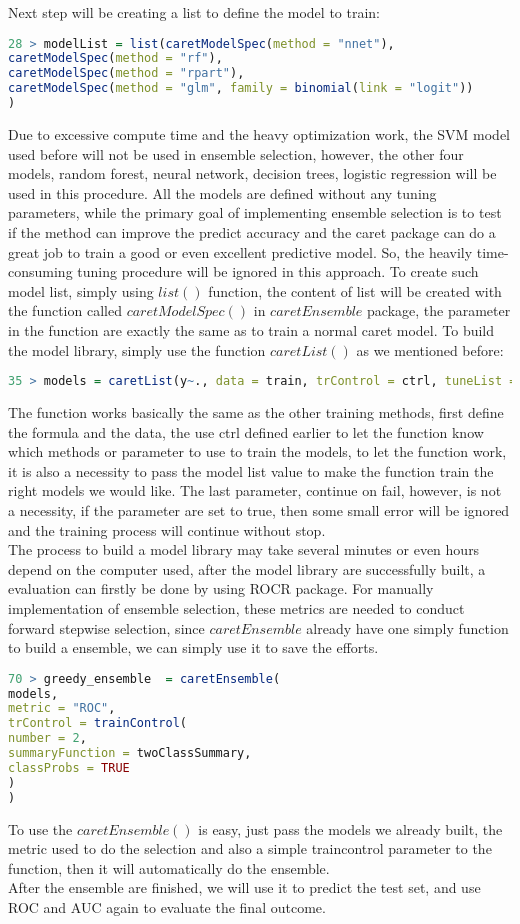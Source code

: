 \documentclass[12pt, a4paper, bibliography=totoc, english]{scrartcl}
\begin{document}
Next step will be creating a list to define the model to train:
\begin{lstlisting}[language = R]
28 > modelList = list(caretModelSpec(method = "nnet"),
caretModelSpec(method = "rf"),
caretModelSpec(method = "rpart"),
caretModelSpec(method = "glm", family = binomial(link = "logit"))
)

\end{lstlisting}
Due to excessive compute time and the heavy optimization work, the SVM model used before will not be used in ensemble selection, however, the other four models, random forest, neural network, decision trees, logistic regression will be used in this procedure. All the models are defined without any tuning parameters, while the primary goal of implementing ensemble selection is to test if the method can improve the predict accuracy and the caret package can do a great job to train a good or even excellent predictive model. So, the heavily time-consuming tuning procedure will be ignored in this approach. To create such model list, simply using $list()$ function, the content of list will be created with the function called $caretModelSpec()$ in $caretEnsemble$ package, the parameter in the function are exactly the same as to train a normal caret model.\indent
To build the model library, simply use the function $caretList()$ as we mentioned before:
\begin{lstlisting}[language = R]
35 > models = caretList(y~., data = train, trControl = ctrl, tuneList = modelList, continue_on_fail = F)
\end{lstlisting}
The function works basically the same as the other training methods, first define the formula and the data, the use ctrl defined earlier to let the function know which methods or parameter to use to train the models, to let the function work, it is also a necessity to pass the model list value to make the function train the right models we would like. The last parameter, continue on fail, however, is not a necessity, if the parameter are set to true, then some small error will be ignored and the training process will continue without stop.\\
The process to build a model library may take several minutes or even hours depend on the computer used, after the model library are successfully built, a evaluation can firstly be done by using ROCR package. For manually implementation of ensemble selection, these metrics are needed to conduct forward stepwise selection, since $caretEnsemble$ already have one simply function to build a ensemble, we can simply use it to save the efforts.
\begin{lstlisting}[language = R]
70 > greedy_ensemble  = caretEnsemble(
models,
metric = "ROC",
trControl = trainControl(
number = 2,
summaryFunction = twoClassSummary,
classProbs = TRUE
)
)
\end{lstlisting}
To use the $caretEnsemble()$ is easy, just pass the models we already built, the metric used to do the selection and also a simple traincontrol parameter to the function, then it will automatically do the ensemble.\\
After the ensemble are finished, we will use it to predict the test set, and use ROC and AUC again to evaluate the final outcome.
\end{document}
